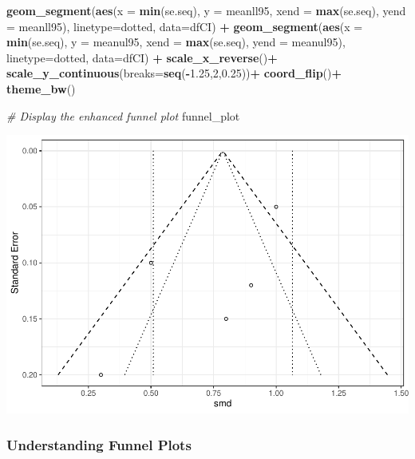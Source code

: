 \documentclass[
]{book}
\newenvironment{Shaded}{\begin{snugshade}}{\end{snugshade}}
\newcommand{\AttributeTok}[1]{\textcolor[rgb]{0.13,0.29,0.53}{#1}}
\newcommand{\CommentTok}[1]{\textcolor[rgb]{0.56,0.35,0.01}{\textit{#1}}}
\newcommand{\DecValTok}[1]{\textcolor[rgb]{0.00,0.00,0.81}{#1}}
\newcommand{\FloatTok}[1]{\textcolor[rgb]{0.00,0.00,0.81}{#1}}
\newcommand{\FunctionTok}[1]{\textcolor[rgb]{0.13,0.29,0.53}{\textbf{#1}}}
\newcommand{\NormalTok}[1]{#1}
\newcommand{\SpecialCharTok}[1]{\textcolor[rgb]{0.81,0.36,0.00}{\textbf{#1}}}
\newcommand{\StringTok}[1]{\textcolor[rgb]{0.31,0.60,0.02}{#1}}
\begin{document}
\begin{Shaded}
\begin{Highlighting}[]
  \FunctionTok{geom\_segment}\NormalTok{(}\FunctionTok{aes}\NormalTok{(}\AttributeTok{x =} \FunctionTok{min}\NormalTok{(se.seq), }\AttributeTok{y =}\NormalTok{ meanll95, }\AttributeTok{xend =} \FunctionTok{max}\NormalTok{(se.seq), }\AttributeTok{yend =}\NormalTok{ meanll95), }\AttributeTok{linetype=}\StringTok{\textquotesingle{}dotted\textquotesingle{}}\NormalTok{, }\AttributeTok{data=}\NormalTok{dfCI) }\SpecialCharTok{+}
  \FunctionTok{geom\_segment}\NormalTok{(}\FunctionTok{aes}\NormalTok{(}\AttributeTok{x =} \FunctionTok{min}\NormalTok{(se.seq), }\AttributeTok{y =}\NormalTok{ meanul95, }\AttributeTok{xend =} \FunctionTok{max}\NormalTok{(se.seq), }\AttributeTok{yend =}\NormalTok{ meanul95), }\AttributeTok{linetype=}\StringTok{\textquotesingle{}dotted\textquotesingle{}}\NormalTok{, }\AttributeTok{data=}\NormalTok{dfCI) }\SpecialCharTok{+}
  \FunctionTok{scale\_x\_reverse}\NormalTok{()}\SpecialCharTok{+}
  \FunctionTok{scale\_y\_continuous}\NormalTok{(}\AttributeTok{breaks=}\FunctionTok{seq}\NormalTok{(}\SpecialCharTok{{-}}\FloatTok{1.25}\NormalTok{,}\DecValTok{2}\NormalTok{,}\FloatTok{0.25}\NormalTok{))}\SpecialCharTok{+}
  \FunctionTok{coord\_flip}\NormalTok{()}\SpecialCharTok{+}
  \FunctionTok{theme\_bw}\NormalTok{()}

\CommentTok{\# Display the enhanced funnel plot}
\NormalTok{funnel\_plot}
\end{Highlighting}
\end{Shaded}

\includegraphics{_main_files/figure-latex/unnamed-chunk-32-1.pdf}

\subsubsection{Understanding Funnel Plots}\label{understanding-funnel-plots}
\end{document}
